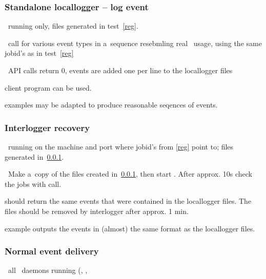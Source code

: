 \subsubsection{Standalone locallogger -- log event}
\label{log}
\req\ running  only, files generated in test~\ref{reg}.

\how\ call  for various event types in a~sequence
resebmling real \LB\ usage, using the same jobid's as in test~\ref{reg}

\result\ API calls return 0, events are added one per line to the locallogger files

\begin{hints}
 client program can be used.

 examples may be adapted to produce reasonable seqences
of events.
\end{hints}

\subsubsection{Interlogger recovery}
\label{recover}
\req\ running  on the machine and port where 
jobid's from \ref{reg} point to; files generated in~\ref{log}.

\how\ Make a~copy of the files created in~\ref{log}, then start
. After approx. 10s check the jobs
with  call. 

\result {} should return the same events that were
contained in the locallogger files. The files should be removed by 
interlogger after approx. 1 min.

\begin{hints}
 example outputs the events in (almost) the same
format as the locallogger files.
\end{hints}

\subsubsection{Normal event delivery}
\label{normal}
\req\ all \LB\ daemons running (, ,

